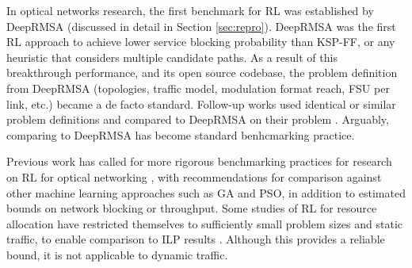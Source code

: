 

In optical networks research, the first benchmark for RL was established by DeepRMSA \cite{chen_deeprmsa_2019} (discussed in detail in Section \ref{sec:repro}). DeepRMSA was the first RL approach to achieve lower service blocking probability than KSP-FF, or any heuristic that considers multiple candidate paths. As a result of this breakthrough performance, and its open source codebase, the problem definition from DeepRMSA (topologies, traffic model, modulation format reach, FSU per link, etc.) became a de facto standard. Follow-up works used identical or similar problem definitions and compared to DeepRMSA on their problem \cite{xu_spectrum_2021,quang_magc-rsa_2022,errea_deep_2023,tang_heuristic_2022,xu_deep_2022,cheng_ptrnet-rsa_2024,yan_drl-based_2024,zhou_opti-deeproute_2024}. Arguably, comparing to DeepRMSA has become standard benhcmarking practice.


Previous work has called for more rigorous benchmarking practices for research on RL for optical networking \cite{di_cicco_deep_2022}, with recommendations for comparison against other machine learning approaches such as GA and PSO, in addition to estimated bounds on network blocking or throughput. Some studies of RL for resource allocation have restricted themselves to sufficiently small problem sizes and static traffic, to enable comparison to ILP results \cite{liu_waveband_2021,di_cicco_deep_2022,zhao_rsa_2022,momo_ziazet_deep_2022,di_cicco_deepls_2023}. Although this provides a reliable bound, it is not applicable to dynamic traffic.

